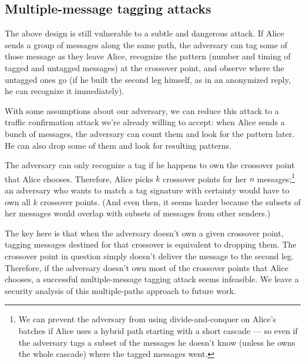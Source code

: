 \documentclass{llncs}
\begin{document}
\subsection{Multiple-message tagging attacks}

The above design is still vulnerable to a subtle and dangerous
attack. If Alice sends a group of messages along the same path, the
adversary can tag some of those message as they leave Alice, recognize
the pattern (number and timing of tagged and untagged messages) at the
crossover point, and observe where the untagged ones go (if he built
the second leg himself, as in an anonymized reply, he can recognize
it immediately).

With some assumptions about our adversary, we can reduce
this attack to a traffic confirmation attack we're already willing to
accept: when Alice sends a bunch of messages, the adversary can count
them and look for the pattern later. He can also drop some of them and
look for resulting patterns.

The adversary can only recognize a tag if he happens to own the crossover
point that Alice chooses.
Therefore, Alice picks $k$ crossover points for her $n$
messages;\footnote{
  We can prevent the adversary from using divide-and-conquer on Alice's
  batches if Alice uses a hybrid path starting with a short cascade ---
  so even if the adversary tags a subset of the messages he doesn't know
  (unless he owns the whole cascade) where the tagged messages went.
}
an adversary who wants to match a tag signature with certainty would
have to own all $k$ crossover points.  (And even then, it seems harder
because the subsets of her messages would overlap with subsets of
messages from other senders.)


The key here is that when the adversary doesn't own a given crossover
point, tagging messages destined for that crossover is equivalent to
dropping them.  The crossover point in question simply doesn't deliver
the message to the second leg. Therefore, if the adversary doesn't own
most of the crossover points that Alice chooses, a successful
multiple-message tagging attack seems infeasible.  We leave a security
analysis of this multiple-paths approach to future work.
\end{document}
